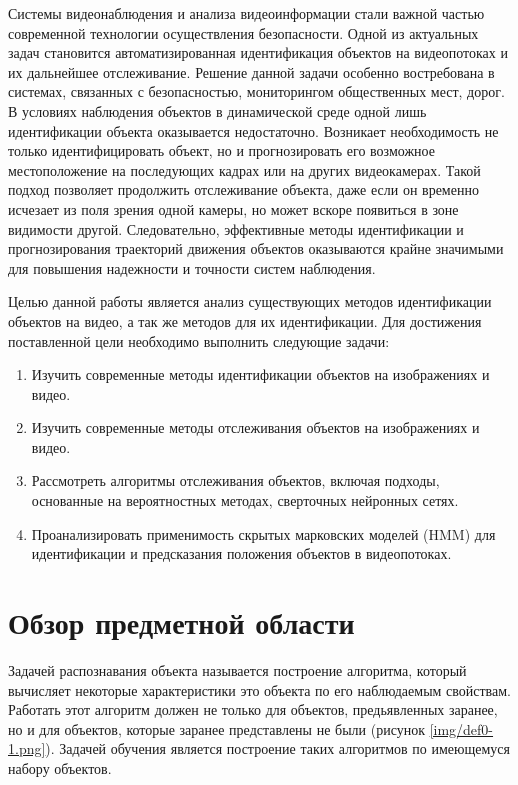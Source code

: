 


\setcounter{page}{2}

\renewcommand{\contentsname}{СОДЕРЖАНИЕ}
\tableofcontents


Системы видеонаблюдения и анализа видеоинформации стали важной частью современной технологии осуществления безопасности. Одной из актуальных задач становится автоматизированная идентификация объектов на видеопотоках и их дальнейшее отслеживание. Решение данной задачи особенно востребована в системах, связанных с безопасностью, мониторингом общественных мест, дорог. В условиях наблюдения объектов в динамической среде одной лишь идентификации объекта оказывается недостаточно. Возникает необходимость не только идентифицировать объект, но и прогнозировать его возможное местоположение на последующих кадрах или на других видеокамерах. Такой подход позволяет продолжить отслеживание объекта, даже если он временно исчезает из поля зрения одной камеры, но может вскоре появиться в зоне видимости другой. Следовательно, эффективные методы идентификации и прогнозирования траекторий движения объектов оказываются крайне значимыми для повышения надежности и точности систем наблюдения.

Целью данной работы является анализ существующих методов идентификации объектов на видео, а так же методов для их идентификации. Для достижения поставленной цели необходимо выполнить следующие задачи:
\begin{enumerate}
    \item Изучить современные методы идентификации объектов на изображениях и видео.
    \item Изучить современные методы отслеживания объектов на изображениях и видео.
    \item Рассмотреть алгоритмы отслеживания объектов, включая подходы, основанные на вероятностных методах, сверточных нейронных сетях.
    \item Проанализировать применимость скрытых марковских моделей (HMM) для идентификации и предсказания положения объектов в видеопотоках.
\end{enumerate}

\chapter{Обзор предметной области}
Задачей распознавания объекта называется построение алгоритма, который вычисляет некоторые характеристики это объекта по его наблюдаемым свойствам. Работать этот алгоритм должен не только для объектов, предьявленных заранее, но и для объектов, которые заранее представлены не были (рисунок \ref{img/def0-1.png}). Задачей обучения является построение таких алгоритмов по имеющемуся набору объектов.

